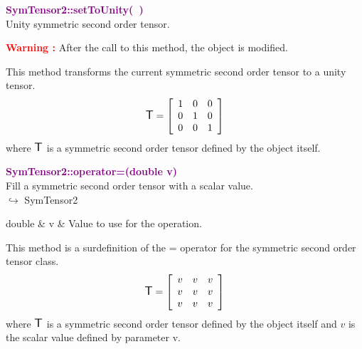 \textcolor{purple}{\textbf{SymTensor2::setToUnity(~)}}\label{SymTensor2::setToUnity()}\\
Unity symmetric second order tensor.

\hspace*{10mm}\textcolor{red}{\textbf{Warning :}} After the call to this method, the object is modified.

This method transforms the current symmetric second order tensor to a unity tensor.
\begin{equation*}
\mbox{\large\ensuremath{\mathsf{T}}}=\left[\begin{array}{ccc}
1&0&0\\
0&1&0\\
0&0&1
\end{array}\right]
\end{equation*}
where $\mbox{\large\ensuremath{\mathsf{T}}}$ is a symmetric second order tensor defined by the object itself.

\textcolor{purple}{\textbf{SymTensor2::operator=(double v)}}\label{SymTensor2::operator=(double v)}\\
Fill a symmetric second order tensor with a scalar value.\\ \hspace*{10mm}$\hookrightarrow$ SymTensor2

\begin{tcolorbox}[width=\textwidth,myArgs,tabularx={ll|R}]
double & v & Value to use for the operation.
\end{tcolorbox}

This method is a surdefinition of the = operator for the symmetric second order tensor class.
\begin{equation*}
\mbox{\large\ensuremath{\mathsf{T}}}=\left[\begin{array}{ccc}
v & v & v\\
v & v & v\\
v & v & v
\end{array}\right]
\end{equation*}
where $\mbox{\large\ensuremath{\mathsf{T}}}$ is a symmetric second order tensor defined by the object itself and $v$ is the scalar value defined by parameter v.

